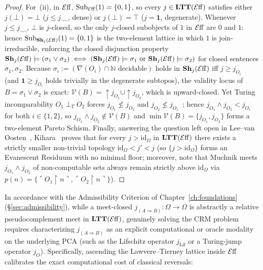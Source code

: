 \begin{proof}
For~(ii), in $\mathcal{E}\mathrm{ff}$, $\mathrm{Sub}_{\mathcal{E}\mathrm{ff}}(1) = \{0, 1\}$, so every $j \in \mathbf{LTT}(\mathcal{E}\mathrm{ff})$ satisfies either $j(\bot) = \bot$ ($j \le j_{\neg\neg}$, dense) or $j(\bot) = \top$ ($j = \mathbf{1}$, degenerate). Whenever $j \le j_{\neg\neg}$, $\bot$ is $j$-closed, so the only $j$-closed subobjects of $1$ in $\mathcal{E}\mathrm{ff}$ are $0$ and $1$: hence $\mathrm{Sub}_{\mathbf{Sh}_j(\mathcal{E}\mathrm{ff})}(1) = \{0, 1\}$ is the two-element lattice in which $1$ is join-irreducible, enforcing the closed disjunction property $\mathbf{Sh}_j(\mathcal{E}\mathrm{ff}) \models (\sigma_1 \lor \sigma_2) \iff (\mathbf{Sh}_j(\mathcal{E}\mathrm{ff}) \models \sigma_1 \text{ or } \mathbf{Sh}_j(\mathcal{E}\mathrm{ff}) \models \sigma_2)$ for closed sentences $\sigma_1, \sigma_2$. Because $\sigma_i := (\nabla(O_i)\cap\mathbb{N}\text{ decidable})$ holds in $\mathbf{Sh}_j(\mathcal{E}\mathrm{ff})$ iff $j \ge j_{O_i}$~\cite{LeeVanOosten13} (and $\mathbf{1} \ge j_{O_i}$ holds trivially in the degenerate subtopos), the validity locus of $B = \sigma_1 \lor \sigma_2$ is exact: $\mathcal{V}(B) = {\uparrow} j_{O_1} \cup {\uparrow} j_{O_2}$, which is upward-closed. Yet Turing incomparability $O_1 \perp_T O_2$ forces $j_{O_1} \not\le j_{O_2}$ and $j_{O_2} \not\le j_{O_1}$~\cite{LeeVanOosten13}; hence $j_{O_1} \wedge j_{O_2} < j_{O_i}$ for both $i \in \{1, 2\}$, so $j_{O_1} \wedge j_{O_2} \notin \mathcal{V}(B)$ and $\min \mathcal{V}(B) = \{j_{O_1}, j_{O_2}\}$ forms a two-element Pareto Schism. Finally, answering the question left open in Lee--van Oosten~\cite{LeeVanOosten13}, Kihara~\cite[\S 4]{Kihara23} proves that for every $j > \mathrm{id}_\Omega$ in $\mathbf{LTT}(\mathcal{E}\mathrm{ff})$ there exists a strictly smaller non-trivial topology $\mathrm{id}_\Omega < j' < j$ (so $\{j > \mathrm{id}_\Omega\}$ forms an Evanescent Residuum with no minimal floor; moreover, note that Muchnik meets $j_{O_1} \wedge j_{O_2}$ of non-computable sets always remain strictly above $\mathrm{id}_\Omega$ via $p(n) = \{\ulcorner O_1\!\upharpoonright\! n\urcorner, \ulcorner O_2\!\upharpoonright\! n\urcorner\}$).
\end{proof}

In accordance with the Admissibility Criterion of Chapter~\ref{ch:foundations} (\S\ref{sec:admissibility}), while a meet-closed $j_{(A \Rightarrow B)}: \Omega \to \Omega$ is abstractly a relative pseudocomplement meet in $\mathbf{LTT}(\mathcal{E}\mathrm{ff})$, genuinely solving the $\mathrm{CRM}$ problem requires characterizing $j_{(A \Rightarrow B)}$ as an explicit computational or oracle modality on the underlying PCA (such as the Lifschitz operator $j_{\mathrm{Lif}}$ or a Turing-jump operator $j_O$). Specifically, ascending the Lawvere--Tierney lattice inside $\mathcal{E}\mathrm{ff}$ calibrates the exact computational cost of classical reversals:

